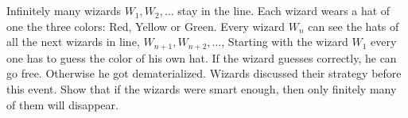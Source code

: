 \documentclass[]{article}
\newcommand{\Rel}{\mathcal{R}}
\newcommand{\N}{\mathbb{N}}
\newcommand{\Q}{\mathbb{Q}}
\newtheorem{theorem}{Theorem}
\begin{document}






\newpage
\section{}
Infinitely many wizards $W_1, W_2,\dots$ stay in the line.
Each wizard wears a hat of one the three colors: Red, Yellow or Green. 
Every wizard $W_n$ can see the hats of all the next wizards in line, $W_{n+1}, W_{n+2}, \dots$,
Starting  with  the  wizard $W_1$ every one has to guess the color of his own hat. 
If the wizard guesses correctly, he can go free. Otherwise he got dematerialized. 
Wizards  discussed  their  strategy  before  this  event. 
Show that if the wizards were smart enough, then only finitely many of them will disappear.
\end{document}
